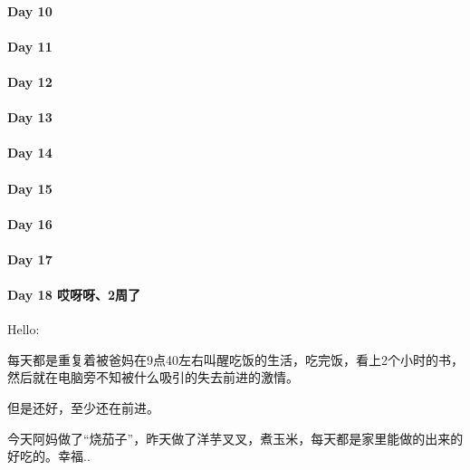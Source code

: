 \documentclass[UTF8,a4paper,8pt]{ctexart}
\begin{document}
 	 \paragraph{Day 10      \quad     }
 	 \paragraph{Day 11      \quad     }
 	 \paragraph{Day 12      \quad     }
 	 \paragraph{Day 13      \quad     }
 	 \paragraph{Day 14      \quad     }
 	 \paragraph{Day 15      \quad     }
 	 \paragraph{Day 16      \quad     }
 	 \paragraph{Day 17      \quad     }
 	 \paragraph{Day 18  哎呀呀、2周了   \quad     }
	 	 Hello:
	 	 
	 	 每天都是重复着被爸妈在9点40左右叫醒吃饭的生活，吃完饭，看上2个小时的书，然后就在电脑旁不知被什么吸引的失去前进的激情。
	 	 
	 	 但是还好，至少还在前进。
	 	 
	 	 今天阿妈做了“烧茄子”，昨天做了洋芋叉叉，煮玉米，每天都是家里能做的出来的好吃的。幸福..
	 	 
\end{document}
